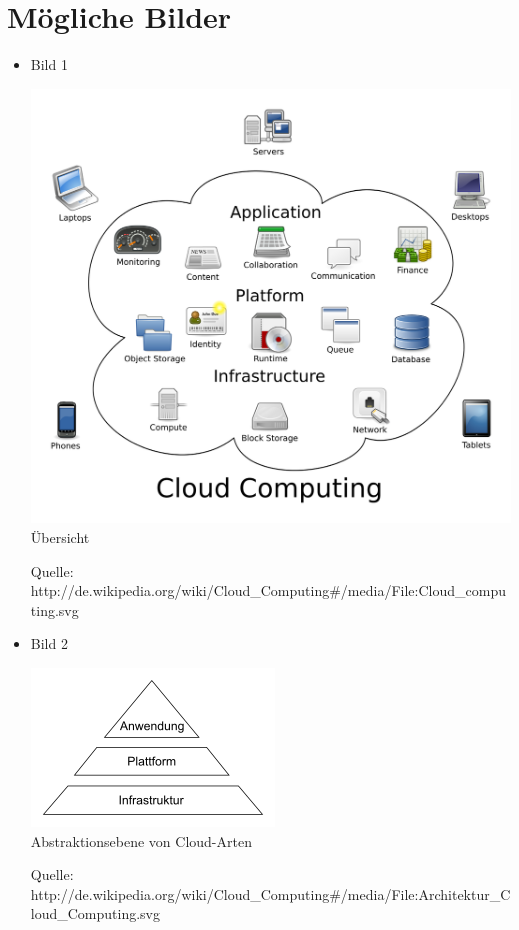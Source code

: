 \section{Mögliche Bilder}
\begin{itemize}
\item Bild 1 
\begin{center}
\includegraphics[scale=0.3]{files/img/lyaton_cloud_overview.png}\\
Übersicht\\
\begin{scriptsize}
Quelle: http://de.wikipedia.org/wiki/Cloud\_Computing\#/media/File:Cloud\_computing.svg
\end{scriptsize}
\end{center}
\item Bild 2 
\begin{center}
\includegraphics[scale=0.6]{files/img/lyaton_cloud_types.png}\\
Abstraktionsebene von Cloud-Arten\\
\begin{scriptsize}
Quelle: http://de.wikipedia.org/wiki/Cloud\_Computing\#/media/File:Architektur\_Cloud\_Computing.svg
\end{scriptsize}
\end{center}
\end{itemize}

